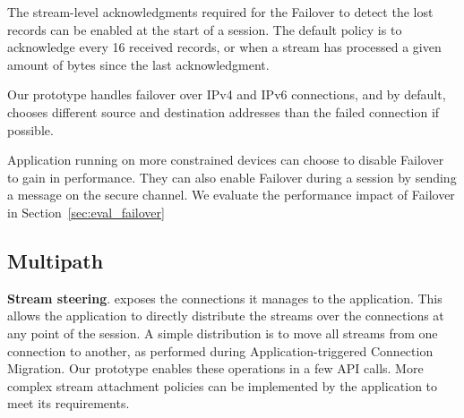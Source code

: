 The stream-level acknowledgments required for the Failover to detect the lost
\tcpls records can be enabled at the start of a \tcpls session. The default
policy is to acknowledge every 16 received records, or when a
stream has processed 
a given amount of 
bytes since the last acknowledgment. 

Our prototype handles failover over IPv4 and IPv6 \tcp connections, and by default, chooses different source and destination addresses than the failed \tcp connection if possible.

Application running on more constrained devices can choose to disable Failover
to gain in performance. They can also enable Failover during a \tcpls session 
by sending a message on the secure channel. 
We evaluate the performance impact of Failover in 
Section~\ref{sec:eval_failover}


\subsection{Multipath}
\label{sec:prot-multipath}

\textbf{Stream steering}.
\tcpls exposes the \tcp connections it manages to the application. This allows 
the application to directly distribute the \tcpls streams over the \tcp 
connections at any point of the \tcpls session. A simple distribution is to 
move all \tcpls streams from one connection to another, as performed during 
Application-triggered Connection Migration. Our prototype enables these 
operations in a few API calls. More complex stream attachment policies can be 
implemented by the application to meet its requirements.

